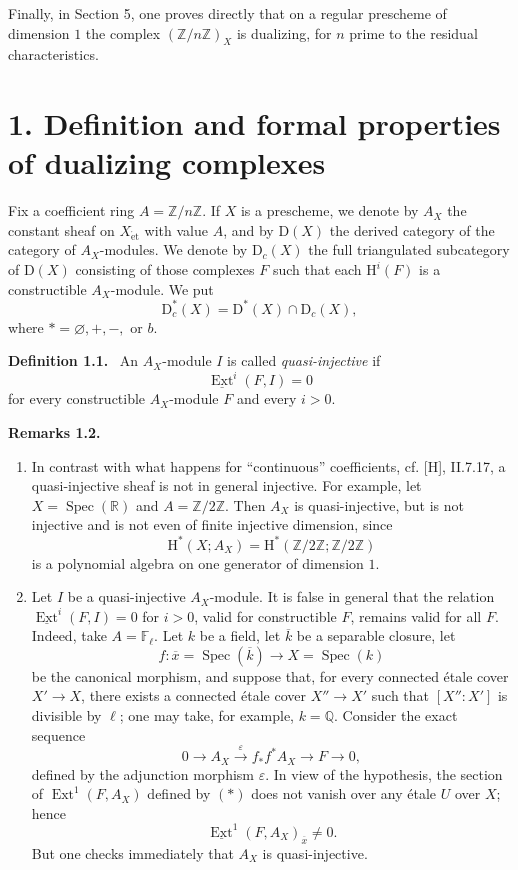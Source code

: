\documentclass[12pt]{article}
\newcommand{\ZZ}{\mathbb Z}
\newcommand{\RR}{\mathbb R}
\newcommand{\FF}{\mathbb F}
\newcommand{\Spec}{\operatorname{Spec}}
\newcommand{\Ext}{\operatorname{Ext}}
\newcommand{\D}{\mathrm D}
\newcommand{\Hh}{\mathrm H}
\newcommand{\ol}[1]{\overline{#1}}
\newenvironment{statement}[1]{\par\medskip\noindent\textbf{#1.}\ }{\par\medskip}
\begin{document}
Finally, in Section 5, one proves directly that on a regular prescheme of dimension $1$ the complex $(\ZZ/n\ZZ)_X$ is dualizing, for $n$ prime to the residual characteristics.

\section*{1. Definition and formal properties of dualizing complexes}

Fix a coefficient ring $A=\ZZ/n\ZZ$. If $X$ is a prescheme, we denote by $A_X$ the constant sheaf on $X_{\mathrm{\acute et}}$ with value $A$, and by $\D(X)$ the derived category of the category of $A_X$-modules. We denote by $\D_c(X)$ the full triangulated subcategory of $\D(X)$ consisting of those complexes $F$ such that each $\Hh^i(F)$ is a constructible $A_X$-module. We put
\[
   \D_c^{*}(X)=\D^{*}(X)\cap\D_c(X),
\]
where $*=\varnothing,+,-,$ or $b$.

\begin{statement}{Definition 1.1}
An $A_X$-module $I$ is called \emph{quasi-injective} if
\[
   \underline{\Ext}^{i}(F,I)=0
\]
for every constructible $A_X$-module $F$ and every $i>0$.
\end{statement}

\begin{statement}{Remarks 1.2}
\begin{enumerate}[label=\alph*)]
\item In contrast with what happens for ``continuous'' coefficients, cf. [H], II.7.17, a quasi-injective sheaf is not in general injective. For example, let $X=\Spec(\RR)$ and $A=\ZZ/2\ZZ$. Then $A_X$ is quasi-injective, but is not injective and is not even of finite injective dimension, since
\[
   \Hh^*(X;A_X)=\Hh^*(\ZZ/2\ZZ;\ZZ/2\ZZ)
\]
is a polynomial algebra on one generator of dimension $1$.

\item Let $I$ be a quasi-injective $A_X$-module. It is false in general that the relation $\underline{\Ext}^i(F,I)=0$ for $i>0$, valid for constructible $F$, remains valid for all $F$. Indeed, take $A=\FF_\ell$. Let $k$ be a field, let $\ol{k}$ be a separable closure, let
\[
   f:\ol{x}=\Spec(\ol{k})\longrightarrow X=\Spec(k)
\]
be the canonical morphism, and suppose that, for every connected étale cover $X'\to X$, there exists a connected étale cover $X''\to X'$ such that $[X'':X']$ is divisible by $\ell$; one may take, for example, $k=\mathbb Q$. Consider the exact sequence
\[
   0\longrightarrow A_X \xrightarrow{\,\varepsilon\,} f_*f^*A_X\longrightarrow F\longrightarrow0,
   \tag{*}
\]
defined by the adjunction morphism $\varepsilon$. In view of the hypothesis, the section of $\Ext^1(F,A_X)$ defined by $(*)$ does not vanish over any étale $U$ over $X$; hence
\[
   \underline{\Ext}^1(F,A_X)_{\ol{x}}\ne0.
\]
But one checks immediately that $A_X$ is quasi-injective.
\end{enumerate}
\end{statement}
\end{document}
